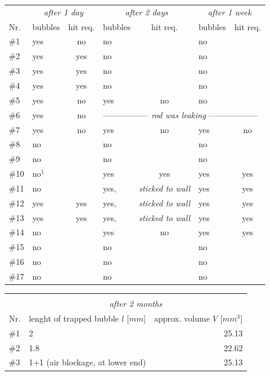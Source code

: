 \documentclass[parskip,bibtotoc,final,twoside=false,titlepage,a4paper,english,12pt,titlepage,a4paper]{scrbook}
\begin{document}
\begin{table}[]
\centering
\begin{tabular}{l|lc|lc|lc}
    & \multicolumn{2}{c}{\textit{after 1 day}} 	& \multicolumn{2}{c}{\textit{after 2 days}}	& \multicolumn{2}{c}{\textit{after 1 week}}	\\ 
Nr. & bubbles	& hit req.	& bubbles 	& hit req.	& bubbles 	& hit req.	\\
\toprule
\#1   & yes	& no		& no		&		& no		&		\\
\#2   & yes	& yes		& no		&		& no		&		\\
\#3   & yes	& yes		& no		&		& no		&		\\
\#4   & yes	& yes		& no		&		& no		&		\\
\#5   & yes	& no		& yes		& no		& no		&		\\
\#6   & yes	& no		& \multicolumn{4}{l}{-----------------\textit{ rod was leaking }------------------}	\\
\#7   & yes	& no		& yes		& no		& yes		& no		\\
\#8   & no	&		& no		&		& no		&		\\
\#9   & no	&		& no		&		& no		&		\\
\#10  & no$^1$	&		& yes		& yes		& yes		& yes		\\
\#11  & no	&		& yes,		& \textit{sticked to wall} &	 yes	& yes\\
\#12  & yes	& yes		& yes,		& \textit{sticked to wall} &	 yes	& yes\\
\#13  & yes	& yes		& yes,		& \textit{sticked to wall} &	 yes	& yes\\
\#14  & no	&   		& yes		& no		& yes		& yes		\\
\#15  & no	&   		& no		&		& no		&		\\
\#16  & no	&   		& no		&		& no		&		\\
\#17  & no	&   		& no		&		& no		&		\\
\bottomrule
\end{tabular}
\begin{tabular}{l|lr}
\multicolumn{3}{c}{}								\\
& \multicolumn{2}{c}{\textit{after 2 months}}					\\ 
Nr. & lenght of trapped bubble $l$ [$mm$] 	& approx. volume $V$ [$mm^3$]	\\
\toprule
\#1   & 2					& 25.13				\\
\#2   & 1.8					& 22.62				\\
\#3   & 1+1 (air blockage, at lower end)	& 25.13				\\

\end{tabular}
\end{table}
\end{document}
